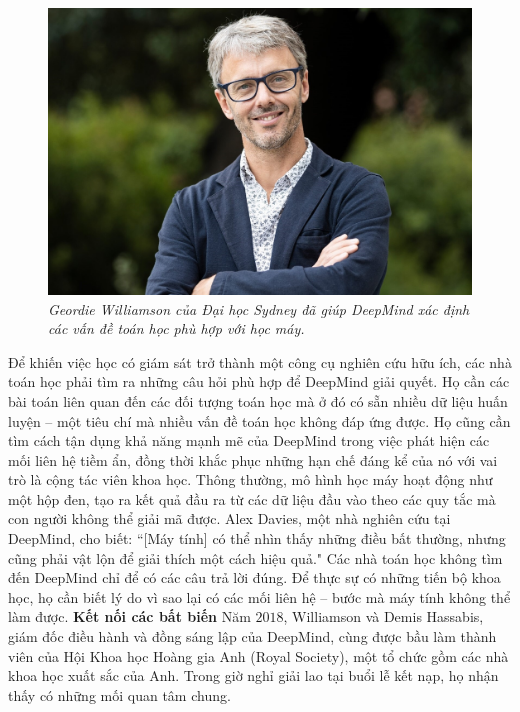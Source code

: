 \begin{multicols}{2}
\begin{figure}[H]
		\captionsetup{labelformat= empty, justification=centering}
		\includegraphics[width=1\linewidth]{2}
		\caption{\small\textit{\color{duongvaotoanhoc}Geordie Williamson của Đại học Sydney đã giúp DeepMind xác định các vấn đề toán học phù hợp với học máy.}}
		\vspace*{-10pt}
	\end{figure}
	Để khiến việc học có giám sát trở thành một công cụ nghiên cứu hữu ích, các nhà toán học phải tìm ra những câu hỏi phù hợp để DeepMind giải quyết. Họ cần các bài toán liên quan đến các đối tượng toán học mà ở đó có sẵn nhiều dữ liệu huấn luyện -- một tiêu chí mà nhiều vấn đề toán học không đáp ứng được.
	\vskip 0.05cm
	Họ cũng cần tìm cách tận dụng khả năng mạnh mẽ của DeepMind trong việc phát hiện các mối liên hệ tiềm ẩn, đồng thời khắc phục những hạn chế đáng kể của nó với vai trò là cộng tác viên khoa học. Thông thường, mô hình học máy hoạt động như một hộp đen, tạo ra kết quả đầu ra từ các dữ liệu đầu vào theo các quy tắc mà con người không thể giải mã được.
	\vskip 0.05cm
	Alex Davies, một nhà nghiên cứu tại DeepMind, cho biết: ``[Máy tính] có thể nhìn thấy những điều bất thường, nhưng cũng phải vật lộn để giải thích một cách hiệu quả."
	\vskip 0.05cm
	Các nhà toán học không tìm đến DeepMind chỉ để có các câu trả lời đúng. Để thực sự có những tiến bộ khoa học, họ cần biết lý do vì sao lại có các mối liên hệ – bước mà máy tính không thể làm được.
	\vskip 0.05cm
	\textbf{\color{duongvaotoanhoc}Kết nối các bất biến}
	\vskip 0.05cm
	Năm $2018$, Williamson và Demis Hassabis, giám đốc điều hành và đồng sáng lập của DeepMind, cùng được bầu làm thành viên của Hội Khoa học Hoàng gia Anh (Royal Society), một tổ chức gồm các nhà khoa học xuất sắc của Anh. Trong  giờ nghỉ giải lao tại buổi lễ kết nạp, họ nhận thấy có những mối quan tâm chung.

\end{multicols}
